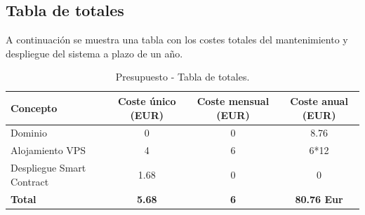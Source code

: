 \newpage

\subsection{Tabla de totales}

A continuación se muestra una tabla con los costes totales del mantenimiento y despliegue del sistema a plazo de un año.

\begin{table}[h!]
\centering
\label{tab:costes}
\begin{tabular}{@{}l S S S@{}}
    \hline
    \textbf{Concepto} & \textbf{Coste único (EUR)} & \textbf{Coste mensual (EUR)} & \textbf{Coste anual (EUR)} \\ 
    \hline
    Dominio & 0 & 0 & 8.76 \\
    Alojamiento VPS & 4 & 6 & {6*12} \\
    Despliegue Smart Contract & 1.68 & 0 & 0 \\ 
    \hline
    \textbf{Total} & \textbf{5.68} & \textbf{6} & \textbf{80.76 Eur} \\ 
    \hline
\end{tabular}
\caption{Presupuesto - Tabla de totales.}
\label{tab:tablatotales}
\end{table}
